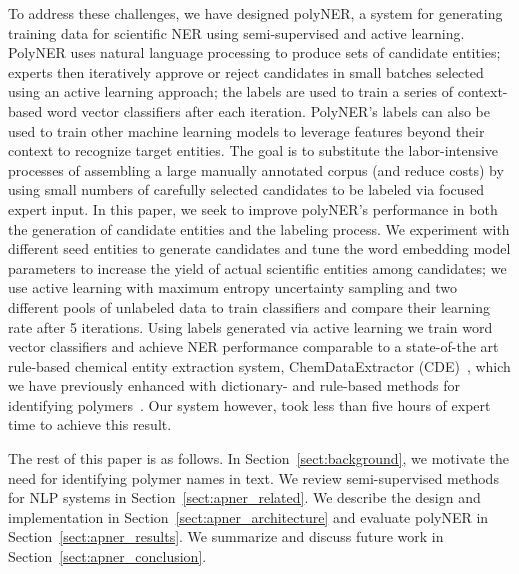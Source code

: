 To address these challenges, we have designed polyNER, a system for generating training data for scientific NER using semi-supervised and active learning.
PolyNER uses natural language processing to produce sets of candidate entities;
experts then iteratively approve or reject candidates in small batches selected using an active learning approach;
the labels are used to train a series of context-based word vector classifiers after each iteration.
PolyNER's labels can also be used to train other machine learning models to leverage features beyond their context to recognize target entities.
The goal is
to substitute the labor-intensive processes of assembling a large
manually annotated corpus (and reduce costs) by using small numbers of carefully selected candidates to be labeled via focused expert input. 
In this paper, we seek to improve polyNER's performance in both the generation of candidate entities and the labeling process.
We experiment with different seed entities to generate candidates and tune the word embedding model parameters to increase the yield of actual scientific entities among candidates; we use active learning with maximum entropy uncertainty sampling and two different pools of unlabeled data to train classifiers and compare their learning rate after 5 iterations. 
Using labels generated via active learning we train word vector classifiers and achieve NER performance comparable to 
a state-of-the art rule-based chemical entity extraction
system, ChemDataExtractor (CDE)~\cite{swain2016chemdataextractor}, which we have previously enhanced
with dictionary- and rule-based methods for identifying polymers~\cite{tchoua2017towards}.
Our system however, took less than five hours of expert time to achieve this result.


The rest of this paper is as follows. 
In Section~\ref{sect:background}, we motivate the need for identifying polymer names in
text. 
We review semi-supervised methods for NLP systems in
Section~\ref{sect:apner_related}. 
We describe the design and implementation in Section~\ref{sect:apner_architecture} and evaluate polyNER
in Section~\ref{sect:apner_results}. We summarize and discuss future work in Section~\ref{sect:apner_conclusion}.
